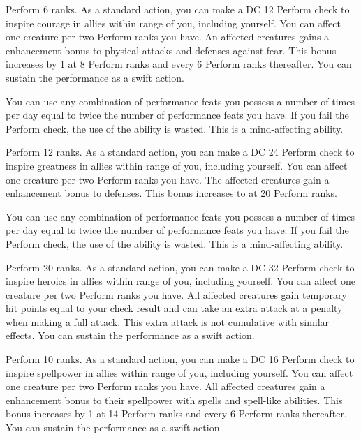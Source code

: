 \featpre Perform 6 ranks.
\featben As a standard action, you can make a DC 12 Perform check to inspire courage in allies within \rngmed range of you, including yourself.
You can affect one creature per two Perform ranks you have.
An affected creatures gains a  enhancement bonus to physical attacks and defenses against fear.
This bonus increases by 1 at 8 Perform ranks and every 6 Perform ranks thereafter.
You can sustain the performance as a swift action.

You can use any combination of performance feats you possess a number of times per day equal to twice the number of performance feats you have.
If you fail the Perform check, the use of the ability is wasted.
This is a mind-affecting ability.

\featpre Perform 12 ranks.
\featben As a standard action, you can make a DC 24 Perform check to inspire greatness in allies within \rngmed range of you, including yourself.
You can affect one creature per two Perform ranks you have.
The affected creatures gain a  enhancement bonus to defenses.
This bonus increases to  at 20 Perform ranks.

You can use any combination of performance feats you possess a number of times per day equal to twice the number of performance feats you have.
If you fail the Perform check, the use of the ability is wasted.
This is a mind-affecting ability.

\featpre Perform 20 ranks.
\featben As a standard action, you can make a DC 32 Perform check to inspire heroics in allies within \rngmed range of you, including yourself.
You can affect one creature per two Perform ranks you have.
All affected creatures gain temporary hit points equal to your check result and can take an extra attack at a  penalty when making a full attack.
This extra attack is not cumulative with similar effects.
You can sustain the performance as a swift action.

\featpre Perform 10 ranks.
\featben As a standard action, you can make a DC 16 Perform check to inspire spellpower in allies within \rngmed range of you, including yourself.
You can affect one creature per two Perform ranks you have.
All affected creatures gain a  enhancement bonus to their spellpower with spells and spell-like abilities.
This bonus increases by 1 at 14 Perform ranks and every 6 Perform ranks thereafter.
You can sustain the performance as a swift action.

